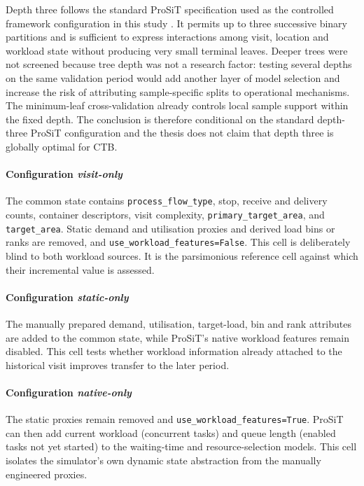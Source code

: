 Depth three follows the standard ProSiT specification used as the controlled
framework configuration in this study \cite{Vinci2026prosit}. It permits up to three successive
binary partitions and is sufficient to express interactions among visit,
location and workload state without producing very small terminal leaves.
Deeper trees were not screened because tree depth was not a research factor:
testing several depths on the same validation period would add another layer
of model selection and increase the risk of attributing sample-specific splits
to operational mechanisms. The minimum-leaf cross-validation already controls
local sample support within the fixed depth. The conclusion is therefore
conditional on the standard depth-three ProSiT configuration and the thesis does
not claim that depth three is globally optimal for CTB.

\paragraph{Configuration \textit{visit-only}}
\label{sec:cfg_rules}

The common state contains \texttt{process\_flow\_type}, stop, receive and
delivery counts, container descriptors, visit complexity,
\texttt{primary\_target\_area}, and \texttt{target\_area}. Static demand and
utilisation proxies and derived load bins or ranks are removed, and
\texttt{use\_workload\_features=False}. This cell is deliberately blind to
both workload sources. It is the parsimonious reference cell against
which their incremental value is assessed.

\paragraph{Configuration \textit{static-only}}

The manually prepared demand, utilisation, target-load, bin and rank
attributes are added to the common state, while ProSiT's native workload
features remain disabled. This cell tests whether workload information already
attached to the historical visit improves transfer to the later period.

\paragraph{Configuration \textit{native-only}}

The static proxies remain removed and
\texttt{use\_workload\_features=True}. ProSiT can then add current workload
(concurrent tasks) and queue length (enabled tasks not yet started) to the
waiting-time and resource-selection models. This cell isolates the simulator's
own dynamic state abstraction from the manually engineered proxies.

